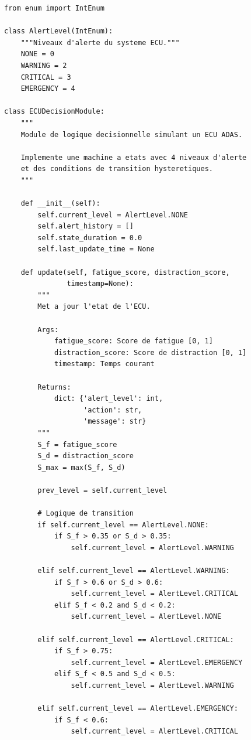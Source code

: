 \begin{lstlisting}[style=pythonstyle, caption={Module de logique décisionnelle ECU.}, label={lst:ecu}]
from enum import IntEnum

class AlertLevel(IntEnum):
    """Niveaux d'alerte du systeme ECU."""
    NONE = 0
    WARNING = 2
    CRITICAL = 3
    EMERGENCY = 4

class ECUDecisionModule:
    """
    Module de logique decisionnelle simulant un ECU ADAS.
    
    Implemente une machine a etats avec 4 niveaux d'alerte
    et des conditions de transition hysteretiques.
    """
    
    def __init__(self):
        self.current_level = AlertLevel.NONE
        self.alert_history = []
        self.state_duration = 0.0
        self.last_update_time = None
    
    def update(self, fatigue_score, distraction_score, 
               timestamp=None):
        """
        Met a jour l'etat de l'ECU.
        
        Args:
            fatigue_score: Score de fatigue [0, 1]
            distraction_score: Score de distraction [0, 1]
            timestamp: Temps courant
            
        Returns:
            dict: {'alert_level': int, 
                   'action': str, 
                   'message': str}
        """
        S_f = fatigue_score
        S_d = distraction_score
        S_max = max(S_f, S_d)
        
        prev_level = self.current_level
        
        # Logique de transition
        if self.current_level == AlertLevel.NONE:
            if S_f > 0.35 or S_d > 0.35:
                self.current_level = AlertLevel.WARNING
        
        elif self.current_level == AlertLevel.WARNING:
            if S_f > 0.6 or S_d > 0.6:
                self.current_level = AlertLevel.CRITICAL
            elif S_f < 0.2 and S_d < 0.2:
                self.current_level = AlertLevel.NONE
        
        elif self.current_level == AlertLevel.CRITICAL:
            if S_f > 0.75:
                self.current_level = AlertLevel.EMERGENCY
            elif S_f < 0.5 and S_d < 0.5:
                self.current_level = AlertLevel.WARNING
        
        elif self.current_level == AlertLevel.EMERGENCY:
            if S_f < 0.6:
                self.current_level = AlertLevel.CRITICAL
        

\end{lstlisting}
